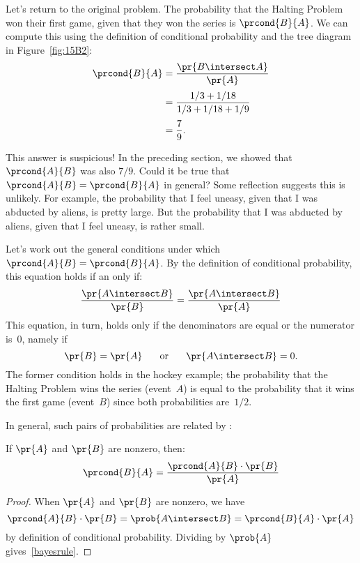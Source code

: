 Let's return to the original problem.  The probability that the
Halting Problem won their first game, given that they won the series
is $\prcond{B}{A}$.  We can compute this using the definition of
conditional probability and the tree diagram in Figure~\ref{fig:15B2}:
%
\begin{align*}
\prcond{B}{A} & = \frac{\pr{B \intersect A}}{\pr{A}} \\[2pt]
              & = \frac{1/3 + 1/18}{1/3 + 1/18 + 1/9} \\[2pt]
              & = \frac{7}{9}.
\end{align*}

This answer is suspicious!  In the preceding section, we showed that
$\prcond{A}{B}$ was also $7/9$.  Could it be true that $\prcond{A}{B}
= \prcond{B}{A}$ in general?  Some reflection suggests this is
unlikely.  For example, the probability that I feel uneasy, given that
I was abducted by aliens, is pretty large.  But the probability that I
was abducted by aliens, given that I feel uneasy, is rather small.

Let's work out the general conditions under which $\prcond{A}{B} =
\prcond{B}{A}$.  By the definition of conditional probability, this
equation holds if an only if:
%
\[
\frac{\pr{A \intersect B}}{\pr{B}} = \frac{\pr{A \intersect B}}{\pr{A}}
\]
%
This equation, in turn, holds only if the denominators are equal or
the numerator is~0, namely if
%
\[
\pr{B} = \pr{A}
\hspace{0.25in} \text{or} \hspace{0.25in}
\pr{A \intersect B} = 0.
\]
%
The former condition holds in the hockey example; the probability that
the Halting Problem wins the series (event~$A$) is equal to the
probability that it wins the first game (event~$B$) since both
probabilities are~$1/2$.

In general, such pairs of probabilities are related by :
%
\begin{theorem}
If $\pr{A}$ and $\pr{B}$ are nonzero, then:
%
\begin{equation}\label{bayesrule}
    \prcond{B}{A} = \frac{\prcond{A}{B} \cdot \pr{B}}{\pr{A}}
\end{equation}
\end{theorem}

\begin{proof}
When $\pr{A}$ and $\pr{B}$ are nonzero, we have
\[
\prcond{A}{B} \cdot \pr{B} = \prob{A \intersect B} = \prcond{B}{A} \cdot \pr{A}
\]
by definition of conditional probability.  Dividing by $\prob{A}$
gives~\eqref{bayesrule}.
\end{proof}

